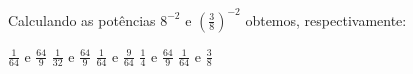 Calculando as potências $8^{-2}$ e $\left(\frac{3}{8}\right)^{-2}$ obtemos, respectivamente:

$\frac{1}{64}$ e $\frac{64}{9}$
$\frac{1}{32}$ e $\frac{64}{9}$
$\frac{1}{64}$ e $\frac{9}{64}$
$\frac{1}{4}$ e $\frac{64}{9}$
$\frac{1}{64}$ e $\frac{3}{8}$


